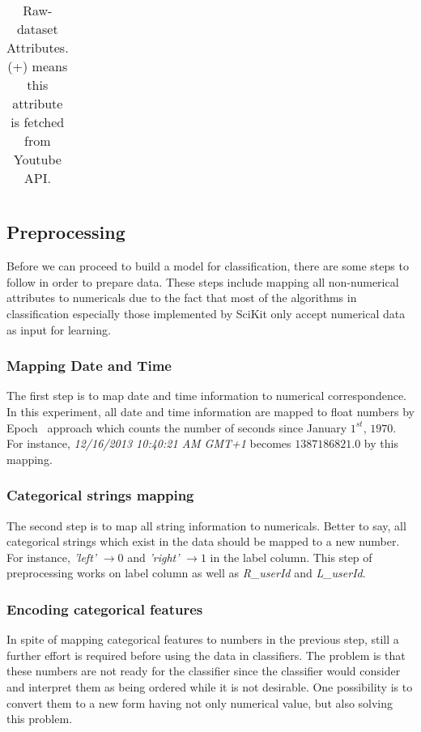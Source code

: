 \begin{table}[p]
\begin{center}
\begin{tabular}{||l|l||}
	\end{tabular}
\end{center}
	\caption{Raw-dataset Attributes. (+) means this attribute is fetched from
	Youtube API.
	\label{ds3:table:attributes}}
\end{table}






\subsection{Preprocessing}

Before we can proceed to build a model for classification, there are some steps
to follow in order to prepare data. These steps include mapping all
non-numerical attributes to numericals due to the fact that most of the
algorithms in classification especially those implemented by SciKit only accept
numerical data as input for learning.

\subsubsection{Mapping Date and Time}

The first step is to map date and time information to numerical correspondence. In
this experiment, all date and time information are mapped to float numbers by
Epoch~\cite{ritchie1971unix} approach which counts the number of seconds
since January $1^{st}$, $1970$. For instance, {\it 12/16/2013 10:40:21 AM GMT+1} becomes
$1387186821.0$ by this mapping.

\subsubsection{Categorical strings mapping}

The second step is to map all string information to numericals. Better to say, all
categorical strings which exist in the data should be mapped to a new number.
For instance, {\it 'left'} $\to 0$ and {\it 'right'} $\to 1$ in the label
column. This step of preprocessing works on label column as well as
{\it R\_userId} and {\it L\_userId}.

\subsubsection{Encoding categorical features} 

In spite of mapping categorical features to numbers in the previous step, still
a further effort is required before using the data in classifiers. The problem
is that these numbers are not ready for the classifier since the classifier
would consider and interpret them as being ordered while it is not desirable.
One possibility is to convert them to a new form having not only numerical
value, but also solving this problem. 

